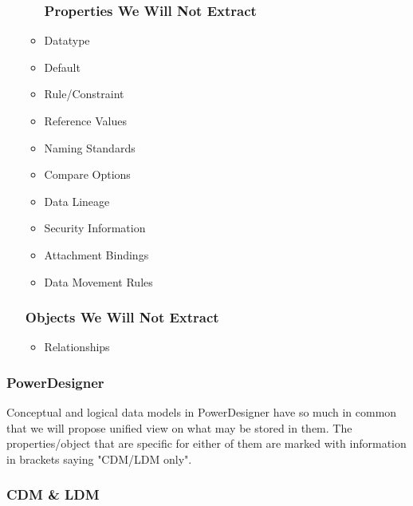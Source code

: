 \documentclass[12pt,a4paper]{report}
\begin{document}
\begin{itemize}
\begin{itemize}
		\subsubsection{Properties We Will Not Extract}
		\item Datatype
		\item Default
		\item Rule/Constraint
		\item Reference Values
		\item Naming Standards
		\item Compare Options
		\item Data Lineage
		\item Security Information
		\item Attachment Bindings
		\item Data Movement Rules
	\end{itemize}
	\subsubsection{Objects We Will Not Extract}
	\begin{itemize}
		\item Relationships
	\end{itemize}
\end{itemize}


\subsubsection{PowerDesigner}

Conceptual and logical data models in PowerDesigner have so much in common that we will propose unified view on what may be stored in them. The properties/object that are specific for either of them are marked with information in brackets saying "CDM/LDM only".

\subsubsection{CDM \& LDM}
\end{document}
